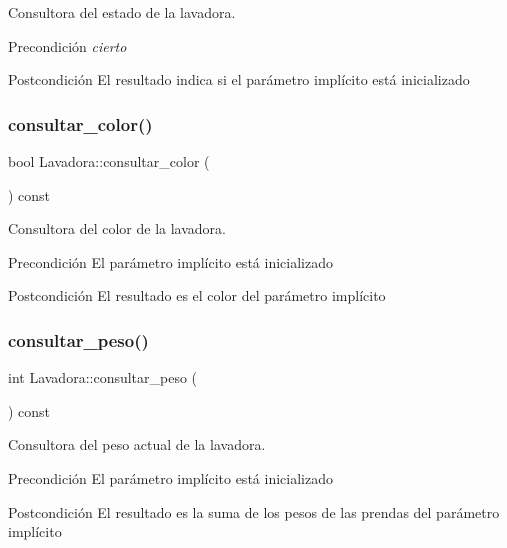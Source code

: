 Consultora del estado de la lavadora. 

\begin{DoxyPrecond}{Precondición}
{\itshape cierto} 
\end{DoxyPrecond}
\begin{DoxyPostcond}{Postcondición}
El resultado indica si el parámetro implícito está inicializado 
\end{DoxyPostcond}
\mbox{\label{class_lavadora_a5d538cc8efce89e5da5a38d879bb2659}} 
\subsubsection{\texorpdfstring{consultar\+\_\+color()}{consultar\_color()}}
{\footnotesize\ttfamily bool Lavadora\+::consultar\+\_\+color (\begin{DoxyParamCaption}{ }\end{DoxyParamCaption}) const}



Consultora del color de la lavadora. 

\begin{DoxyPrecond}{Precondición}
El parámetro implícito está inicializado 
\end{DoxyPrecond}
\begin{DoxyPostcond}{Postcondición}
El resultado es el color del parámetro implícito 
\end{DoxyPostcond}
\mbox{\label{class_lavadora_a411751a432a84ab91196e6b827190f05}} 
\subsubsection{\texorpdfstring{consultar\+\_\+peso()}{consultar\_peso()}}
{\footnotesize\ttfamily int Lavadora\+::consultar\+\_\+peso (\begin{DoxyParamCaption}{ }\end{DoxyParamCaption}) const}



Consultora del peso actual de la lavadora. 

\begin{DoxyPrecond}{Precondición}
El parámetro implícito está inicializado 
\end{DoxyPrecond}
\begin{DoxyPostcond}{Postcondición}
El resultado es la suma de los pesos de las prendas del parámetro implícito 
\end{DoxyPostcond}
\mbox{\label{class_lavadora_a725ef6a2786b400e0cffebe7a690602e}} 
